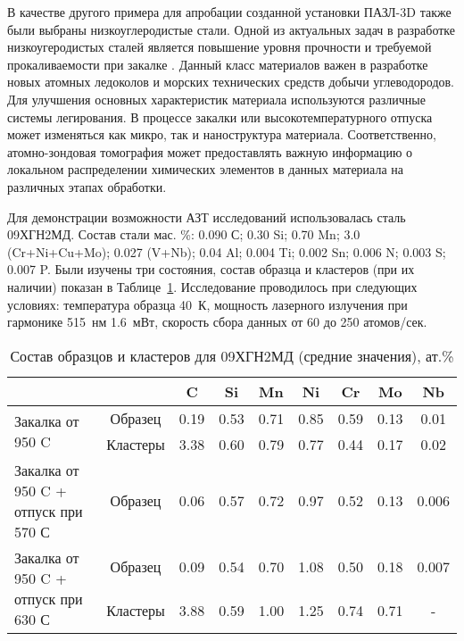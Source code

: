 В качестве другого примера для апробации созданной установки ПАЗЛ-3D также были выбраны низкоуглеродистые стали. Одной из актуальных задач в разработке низкоугеродистых сталей является повышение уровня прочности и требуемой прокаливаемости при закалке \cite{scbibGlubev}. Данный класс материалов важен в разработке новых атомных ледоколов и морских технических средств добычи углеводородов. Для улучшения основных характеристик материала используются различные системы легирования. В процессе закалки или высокотемпературного отпуска может изменяться как микро, так и наноструктура материала. Соответственно, атомно-зондовая томография может предоставлять важную информацию о локальном распределении химических элементов в данных материала на различных этапах обработки.

Для демонстрации возможности АЗТ исследований использовалась сталь 09ХГН2МД. Состав стали мас. \%: 0.090 С; 0.30 Si; 0.70 Mn; 3.0 (Cr+Ni+Cu+Mo); 0.027 (V+Nb); 0.04 Al; 0.004 Ti; 0.002 Sn; 0.006 N; 0.003 S; 0.007 P. Были изучены три состояния,  состав образца и кластеров (при их наличии) показан в Таблице~\cref{tab:SteelComposition09X}. Исследование проводилось при следующих условиях: температура образца 40~К, мощность лазерного излучения при гармонике 515~нм 1.6~мВт, скорость сбора данных от 60 до 250 атомов/сек.


\begin{table} [htbp]
	\centering
	\caption{Состав образцов и кластеров для 09ХГН2МД (средние значения), ат.\%}
	\label{tab:SteelComposition09X}%
	\begin{SingleSpace}
		\begin{tabular}{| p{4.5cm} | c | c | c | c | c | c | c | c |}
			\hline
			 & & C & Si & Mn & Ni & Cr & Mo & Nb     \\ \hline
			\multirow{2}{*}{Закалка от 950 \textdegree C} & Образец & 0.19 & 0.53 & 0.71 & 0.85 & 0.59 & 0.13 & 0.01    \\ \cline{2-9}
			& Кластеры & 3.38 & 0.60 & 0.79 & 0.77 & 0.44 & 0.17 & 0.02    \\  \hline		
			Закалка от 950 \textdegree C + отпуск при 570 \textdegree С & Образец & 0.06 & 0.57 & 0.72 & 0.97 & 0.52 & 0.13 & 0.006    \\ \hline
			\multirow{2}{45mm}{Закалка от 950 \textdegree C + отпуск при 630 \textdegree С} & Образец & 0.09 & 0.54 & 0.70 & 1.08 & 0.50 & 0.18 & 0.007    \\ \cline{2-9}
			& Кластеры & 3.88 & 0.59 & 1.00 & 1.25 & 0.74 & 0.71 & -    \\  \hline	
		\end{tabular}%
	\end{SingleSpace}
\end{table}

